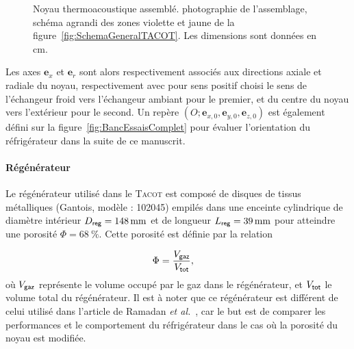 \begin{figure}[!ht]
    \centering
	\begin{subfigure}[c]{.49\textwidth}
		\centering
		\caption{}
		\label{fig:PhotoNoyau}
	\end{subfigure}		
	\begin{subfigure}[c]{.49\textwidth}
		\centering
		
		\caption{}
		\label{fig:SchemaNoyau}
	\end{subfigure}	    
    \caption{Noyau thermoacoustique assemblé.  photographie de l'assemblage,  schéma agrandi des zones violette et jaune de la figure~\ref{fig:SchemaGeneralTACOT}. Les dimensions sont données en \unit{\centi\meter}.}
    \label{fig:PhotoSchemaNoyau}
\end{figure}


Les axes $\mathbf e_x$ et $\mathbf e_r$ sont alors respectivement associés aux directions axiale et radiale du noyau, respectivement avec pour sens positif choisi le sens de l'échangeur froid vers l'échangeur ambiant pour le premier, et du centre du noyau vers l'extérieur pour le second. Un repère $(O;\mathbf e_{x,0},\mathbf e_{y,0},\mathbf e_{z,0})$ est également défini sur la figure~\ref{fig:BancEssaisComplet} pour évaluer l'orientation du réfrigérateur dans la suite de ce manuscrit.\medskip

\paragraph{Régénérateur} Le régénérateur utilisé dans le \textsc{Tacot} est composé de  disques de tissus métalliques (Gantois, modèle : 102045) empilés dans une enceinte cylindrique de diamètre intérieur $D_{\sf reg}=\qty{148}{\mm}$ et de longueur $L_{\sf reg}=\qty{39}{\mm}$ pour atteindre une porosité $\Phi=\qty{68}{\percent}$. Cette porosité est définie par la relation

\begin{align}
	\Phi &= \frac{V_{\sf gaz}}{V_{\sf tot}}, \label{eq:Porosite_Volume}%
\end{align}
où $V_{\sf gaz}$ représente le volume occupé par le gaz dans le régénérateur, et $V_{\sf tot}$ le volume total du régénérateur. Il est à noter que ce régénérateur est différent de celui utilisé dans l'article de Ramadan \textit{et al.}~\cite{ramadan_design_2021}, car le but est de comparer les performances et le comportement du réfrigérateur dans le cas où la porosité du noyau est modifiée. 

